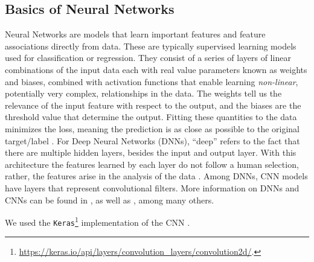 


\subsection{Basics of Neural Networks}\label{subsection: intro_neural_network}
Neural Networks are models that learn important features and feature associations directly from data. %
These are typically supervised learning models used for classification or regression. They consist of a series of layers of linear combinations of the input data each with real value parameters known as weights and biases, combined with activation functions that enable learning {\it non-linear}, potentially very complex, relationships in the data. The weights tell us the relevance of the input feature with respect to the output, and the biases are the threshold value that determine the output. %
Fitting these quantities to the data minimizes the %
loss,
meaning the prediction is as close as possible to the original target/label \citep{nielsen_NN}. For Deep Neural Networks (DNNs), ``deep'' refers to the fact that there are multiple hidden layers, besides the input and output layer.  %
With this architecture the features learned by each layer do not follow a human selection, rather, the features arise in the analysis of the data \citep{LeCun_Bengio_Hinton_2015}. Among DNNs, CNN models have layers that represent convolutional filters.
More information on DNNs and CNNs can be found in \cite{DBLP:journals/corr/abs-1803-08375, 10.5555/2999134.2999257, Dieleman_2015}, as well as \cite{Gieseke_2017}, among many others.

We used the \texttt{Keras}\footnote{\url{https://keras.io/api/layers/convolution\_layers/convolution2d/}.} implementation of the CNN \citep{chollet2015keras}.




